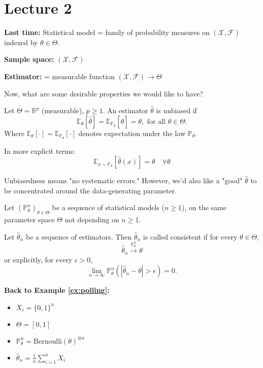 \documentclass[open=any, 11pt,paper=A4]{scrreprt}
\begin{document}
\section*{Lecture 2}

\textbf{Last time:} Statistical model = family of probability measures on $(\mathcal{X}, \mathcal{F})$ indexed by $\theta \in \Theta$. 

\textbf{Sample space:} $(\mathcal{X}, \mathcal{F})$

\textbf{Estimator:} = measurable function $(\mathcal{X}, \mathcal{F}) \to \Theta$

Now, what are some desirable properties we would like to have?

\begin{definition}\label{def:unbiased}
Let $\Theta = \mathbb{R}^p$ (measurable), $p \geq 1$. An estimator $\hat{\theta}$ is unbiased if 
\[
    \mathbb{E}_{\theta}[\hat{\theta}] = \mathbb{E}_{\mathbb{P}_\theta}[\hat{\theta}] = \theta, \text{ for all } \theta \in \Theta.
\]
Where $\mathbb{E}_{\theta}[\cdot] = \mathbb{E}_{\mathbb{P}_\theta}[\cdot]$ denotes expectation under the law $\mathbb{P}_\theta$.
\end{definition}


In more explicit terms:
\[
    \mathbb{E}_{x \sim \mathbb{P}_\theta}[\hat{\theta}(x)] = \theta \quad \forall \theta
\]

\begin{remark}[Unbiasedness]\label{rem:unbiasedness}
Unbiasedness means "no systematic errors." However, we'd also like a "good" $\hat{\theta}$ to be concentrated around the data-generating parameter.
\end{remark}

\begin{definition}\label{def:consistent}
Let $(\mathbb{P}_{\theta}^n)_{\theta \in \Theta}$ be a sequence of statistical models ($n \geq 1$), on the same parameter space $\Theta$ not depending on $n \geq 1$.

Let $\hat{\theta}_n$ be a sequence of estimators. Then $\hat{\theta}_n$ is called consistent if for every $\theta \in \Theta$,
\[
    \hat{\theta}_n \xrightarrow{\mathbb{P}_\theta^n} \theta
\]
or explicitly, for every $\epsilon > 0$,
\[
    \lim_{n \to \infty} \mathbb{P}^n_\theta (|\hat{\theta}_n - \theta| > \epsilon) = 0.
\]
\end{definition}

\textbf{Back to Example \ref{ex:polling}:}
\begin{itemize}
    \item $X_i = \{0, 1\}^n$
    \item $\Theta = [0, 1]$
    \item $\mathbb{P}_\theta^n = \text{Bernoulli}(\theta)^{\otimes n}$
    \item $\hat{\theta}_n = \frac{1}{n} \sum_{i=1}^{n} X_i$
\end{itemize}
\end{document}
